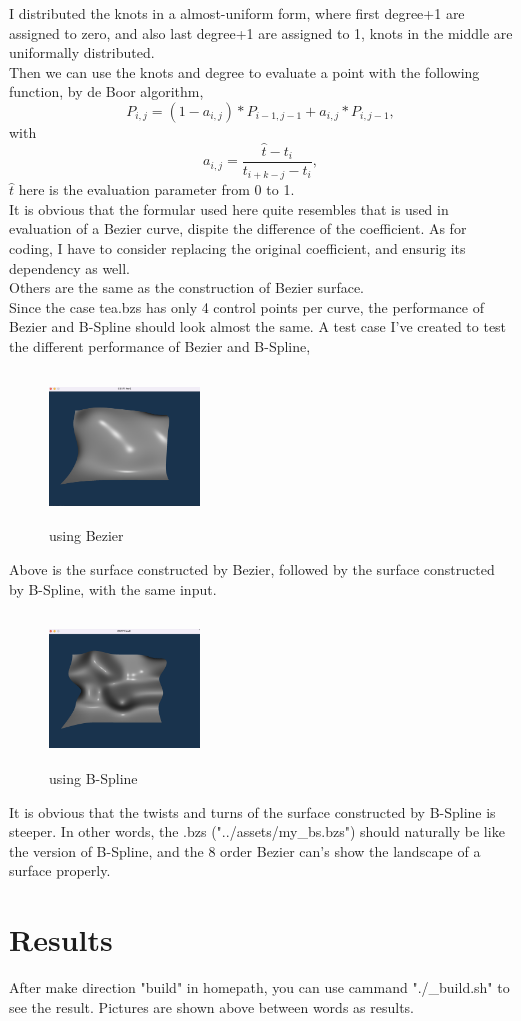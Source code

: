 \documentclass[acmtog]{acmart}
\begin{document}
\begin{enumerate}
	I distributed the knots in a almost-uniform form, where first degree+1 are assigned to zero, and also last degree+1 are assigned to 1, knots in the middle are uniformally distributed.\\
	Then we can use the knots and degree to evaluate a point with the following function, by de Boor algorithm, 
	$$P_{i,j} = (1-a_{i,j})*P_{i-1,j-1} + a_{i,j}*P_{i,j-1},$$ with 
	$$a_{i,j} = \frac{\hat{t}-t_i}{t_{i+k-j}-t_i},$$ $\hat{t}$ here is the evaluation parameter from 0 to 1.\\
	It is obvious that the formular used here quite resembles that is used in evaluation of a Bezier curve, dispite the difference of the coefficient. As for coding, I have to consider replacing the original coefficient, and ensurig its dependency as well.\\
	Others are the same as the construction of Bezier surface.\\
	Since the case tea.bzs has only 4 control points per curve, the performance of Bezier and B-Spline should look almost the same.
	A test case I've created to test the different performance of Bezier and B-Spline, 
	\begin{figure}[h]
		\includegraphics[width=4cm,height=4cm]{using_bezier.png}
		\caption{using Bezier}
	\end{figure}
	Above is the surface constructed by Bezier, followed by the surface constructed by B-Spline, with the same input.\\
	\begin{figure}[h]
		\includegraphics[width=4cm,height=4cm]{using_bspline.png}
		\caption{using B-Spline}
	\end{figure}
	It is obvious that the twists and turns of the surface constructed by B-Spline is steeper. In other words, the .bzs ("../assets/my\_bs.bzs") should naturally be like the version of B-Spline, and the 8 order Bezier can's show the landscape of a surface properly.
\end{enumerate}
\section{Results}
After make direction "build" in homepath, you can use cammand "./\_build.sh" to see the result. Pictures are shown above between words as results.
\end{document}
